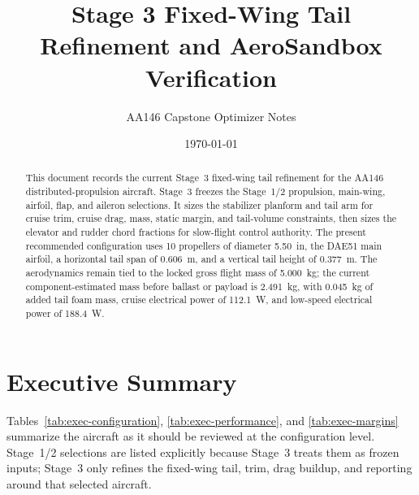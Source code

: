 \documentclass[11pt]{article}
\title{Stage 3 Fixed-Wing Tail Refinement and AeroSandbox Verification}
\author{AA146 Capstone Optimizer Notes}
\date{\today}
\begin{document}
\maketitle

\begin{abstract}
This document records the current Stage~3 fixed-wing tail refinement for the AA146 distributed-propulsion aircraft. Stage~3 freezes the Stage~1/2 propulsion, main-wing, airfoil, flap, and aileron selections. It sizes the stabilizer planform and tail arm for cruise trim, cruise drag, mass, static margin, and tail-volume constraints, then sizes the elevator and rudder chord fractions for slow-flight control authority. The present recommended configuration uses 10 propellers of diameter \SI{5.50}{in}, the DAE51 main airfoil, a horizontal tail span of \SI{0.606}{m}, and a vertical tail height of \SI{0.377}{m}. The aerodynamics remain tied to the locked gross flight mass of \SI{5.000}{kg}; the current component-estimated mass before ballast or payload is \SI{2.491}{kg}, with \SI{0.045}{kg} of added tail foam mass, cruise electrical power of \SI{112.1}{W}, and low-speed electrical power of \SI{188.4}{W}.
\end{abstract}

\section{Executive Summary}
Tables~\ref{tab:exec-configuration}, \ref{tab:exec-performance}, and \ref{tab:exec-margins} summarize the aircraft as it should be reviewed at the configuration level. Stage~1/2 selections are listed explicitly because Stage~3 treats them as frozen inputs; Stage~3 only refines the fixed-wing tail, trim, drag buildup, and reporting around that selected aircraft.
\end{document}
